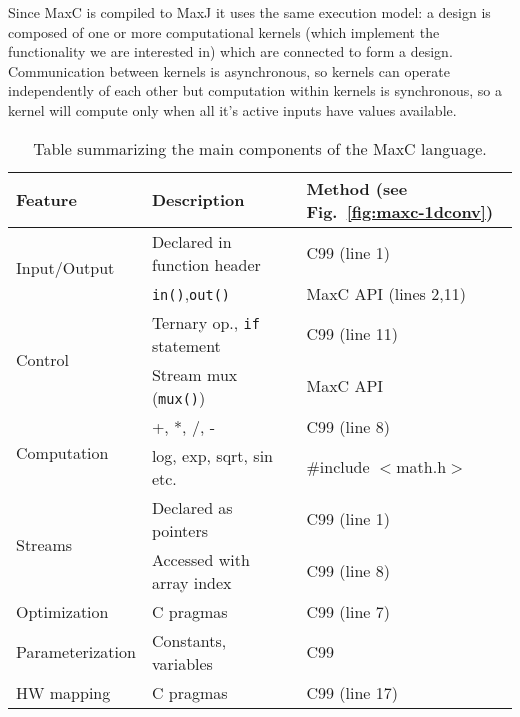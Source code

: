 Since MaxC is compiled to MaxJ it uses the same execution model: a
design is composed of one or more computational kernels (which
implement the functionality we are interested in) which are connected
to form a design. Communication between kernels is asynchronous, so
kernels can operate independently of each other but computation within
kernels is synchronous, so a kernel will compute only when all it's
active inputs have values available.

\begin{table}[!h]
  \centering
\renewcommand{\arraystretch}{1.2}
\caption{Table summarizing the main components of the MaxC language.}
\label{table:maxc-features}
\begin{tabular}{l|l|l}
\hline
\bf{Feature}                   & \bf{Description}                   & \bf{Method (see Fig.~\ref{fig:maxc-1dconv})} \\
\hline\hline
  \multirow{2}{*}{Input/Output}         & Declared in function header          & C99 (line 1)                                 \\\cline{2-3}       & \texttt{in()},\texttt{out()}  & MaxC API (lines 2,11) \\
\hline
  \multirow{2}{*}{Control}     & Ternary op., \texttt{if} statement & C99 (line 11)                                \\\cline{2-3}      & Stream mux (\texttt{mux()})       & MaxC API  \\
\hline
\multirow{2}{*}{Computation} & +, *, /, -                         & C99 (line 8)                           \\\cline{2-3} & log, exp, sqrt, sin etc.  & \#include $<$math.h$>$  \\
\hline
  \multirow{2}{*}{Streams}     & Declared as pointers               & C99 (line 1)                                 \\\cline{2-3}       & Accessed with array index & C99 (line 8) \\
\hline
  Optimization                 & C pragmas                   & C99 (line 7)                                 \\
\hline
  Parameterization             & Constants, variables                   & C99                                          \\
\hline
HW mapping                  & C pragmas                   & C99 (line 17)                                \\

\end{tabular}
\end{table}

